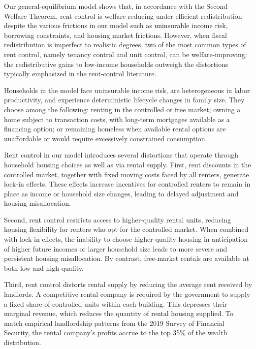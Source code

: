 \documentclass[parskip=full]{article}
\begin{document}
Our general-equilibrium model shows that, in accordance with the Second Welfare Theorem, rent control is welfare-reducing under efficient redistribution despite the various frictions in our model such as uninsurable income risk, borrowing constraints, and housing market frictions. However, when fiscal redistribution is imperfect to realistic degrees, two of the most common types of rent control, namely tenancy control and unit control, can be welfare-improving: the redistributive gains to low-income households outweigh the distortions typically emphasized in the rent-control literature.

Households in the model face uninsurable income risk, are heterogeneous in labor productivity, and experience deterministic lifecycle changes in family size. They choose among the following: renting in the controlled or free market; owning a home subject to transaction costs, with long-term mortgages available as a financing option; or remaining homeless when available rental options are unaffordable or would require excessively constrained consumption.

Rent control in our model introduces several distortions that operate through household housing choices as well as via rental supply. First, rent discounts in the controlled market, together with fixed moving costs faced by all renters, generate lock-in effects. These effects increase incentives for controlled renters to remain in place as income or household size changes, leading to delayed adjustment and housing misallocation.

Second, rent control restricts access to higher-quality rental units, reducing housing flexibility for renters who opt for the controlled market. When combined with lock-in effects, the inability to choose higher-quality housing in anticipation of higher future incomes or larger household size leads to more severe and persistent housing misallocation. By contrast, free-market rentals are available at both low and high quality.

Third, rent control distorts rental supply by reducing the average rent received by landlords. A competitive rental company is required by the government to supply a fixed share of controlled units within each building. This depresses their marginal revenue, which reduces the quantity of rental housing supplied. To match empirical landlordship patterns from the 2019 Survey of Financial Security, the rental company's profits accrue to the top 35\% of the wealth distribution. 
\end{document}

